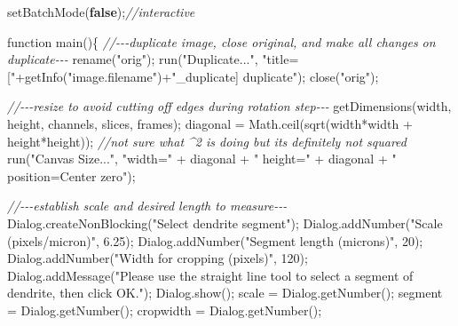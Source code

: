 \documentclass[
  12pt,
  a4paper,
]{book}
\newenvironment{Shaded}{}{}
\newcommand{\CommentTok}[1]{\textcolor[rgb]{0.38,0.63,0.69}{\textit{#1}}}
\newcommand{\DecValTok}[1]{\textcolor[rgb]{0.25,0.63,0.44}{#1}}
\newcommand{\FloatTok}[1]{\textcolor[rgb]{0.25,0.63,0.44}{#1}}
\newcommand{\KeywordTok}[1]{\textcolor[rgb]{0.00,0.44,0.13}{\textbf{#1}}}
\newcommand{\NormalTok}[1]{#1}
\newcommand{\OperatorTok}[1]{\textcolor[rgb]{0.40,0.40,0.40}{#1}}
\newcommand{\StringTok}[1]{\textcolor[rgb]{0.25,0.44,0.63}{#1}}
\begin{document}
\begin{Shaded}
\begin{Highlighting}[]
\NormalTok{setBatchMode}\OperatorTok{(}\KeywordTok{false}\OperatorTok{);}\CommentTok{//interactive}

\NormalTok{function main}\OperatorTok{()\{}
    \CommentTok{//{-}{-}{-}duplicate image, close original, and make all changes on duplicate{-}{-}{-}}
\NormalTok{    rename}\OperatorTok{(}\StringTok{"orig"}\OperatorTok{);}
\NormalTok{    run}\OperatorTok{(}\StringTok{"Duplicate..."}\OperatorTok{,} \StringTok{"title=["}\OperatorTok{+}\NormalTok{getInfo}\OperatorTok{(}\StringTok{"image.filename"}\OperatorTok{)+}\StringTok{"\_duplicate] duplicate"}\OperatorTok{);}
\NormalTok{    close}\OperatorTok{(}\StringTok{"orig"}\OperatorTok{);}
        
    \CommentTok{//{-}{-}{-}resize to avoid cutting off edges during rotation step{-}{-}{-}}
\NormalTok{    getDimensions}\OperatorTok{(}\NormalTok{width}\OperatorTok{,}\NormalTok{ height}\OperatorTok{,}\NormalTok{ channels}\OperatorTok{,}\NormalTok{ slices}\OperatorTok{,}\NormalTok{ frames}\OperatorTok{);}
\NormalTok{    diagonal }\OperatorTok{=}\NormalTok{ Math}\OperatorTok{.}\NormalTok{ceil}\OperatorTok{(}\NormalTok{sqrt}\OperatorTok{(}\NormalTok{width}\OperatorTok{*}\NormalTok{width }\OperatorTok{+}\NormalTok{ height}\OperatorTok{*}\NormalTok{height}\OperatorTok{));} \CommentTok{//not sure what \^{}2 is doing but it\textquotesingle{}s definitely not squared}
\NormalTok{    run}\OperatorTok{(}\StringTok{"Canvas Size..."}\OperatorTok{,} \StringTok{"width="} \OperatorTok{+}\NormalTok{ diagonal }\OperatorTok{+} \StringTok{" height="} \OperatorTok{+}\NormalTok{ diagonal }\OperatorTok{+} \StringTok{" position=Center zero"}\OperatorTok{);}
        
    \CommentTok{//{-}{-}{-}establish scale and desired length to measure{-}{-}{-}}
\NormalTok{    Dialog}\OperatorTok{.}\NormalTok{createNonBlocking}\OperatorTok{(}\StringTok{"Select dendrite segment"}\OperatorTok{);}
\NormalTok{    Dialog}\OperatorTok{.}\NormalTok{addNumber}\OperatorTok{(}\StringTok{"Scale (pixels/micron)"}\OperatorTok{,} \FloatTok{6.25}\OperatorTok{);}
\NormalTok{    Dialog}\OperatorTok{.}\NormalTok{addNumber}\OperatorTok{(}\StringTok{"Segment length (microns)"}\OperatorTok{,} \DecValTok{20}\OperatorTok{);}
\NormalTok{    Dialog}\OperatorTok{.}\NormalTok{addNumber}\OperatorTok{(}\StringTok{"Width for cropping (pixels)"}\OperatorTok{,} \DecValTok{120}\OperatorTok{);}
\NormalTok{    Dialog}\OperatorTok{.}\NormalTok{addMessage}\OperatorTok{(}\StringTok{"Please use the straight line tool to select a segment of dendrite, then click \textquotesingle{}OK\textquotesingle{}."}\OperatorTok{);}
\NormalTok{    Dialog}\OperatorTok{.}\NormalTok{show}\OperatorTok{();}
\NormalTok{    scale }\OperatorTok{=}\NormalTok{ Dialog}\OperatorTok{.}\NormalTok{getNumber}\OperatorTok{();}
\NormalTok{    segment }\OperatorTok{=}\NormalTok{ Dialog}\OperatorTok{.}\NormalTok{getNumber}\OperatorTok{();}
\NormalTok{    cropwidth }\OperatorTok{=}\NormalTok{ Dialog}\OperatorTok{.}\NormalTok{getNumber}\OperatorTok{();}
    

\end{Highlighting}
\end{Shaded}
\end{document}

